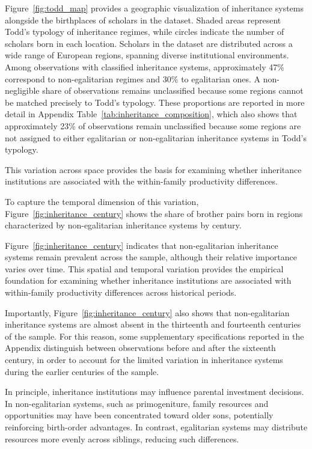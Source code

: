 Figure~\ref{fig:todd_map} provides a geographic visualization of inheritance systems alongside the birthplaces of scholars in the dataset. Shaded areas represent Todd’s typology of inheritance regimes, while circles indicate the number of scholars born in each location.
Scholars in the dataset are distributed across a wide range of European regions, spanning diverse institutional environments. Among observations with classified inheritance systems, approximately 47\% correspond to non-egalitarian regimes and 30\% to egalitarian ones. A non-negligible share of observations remains unclassified because some regions cannot be matched precisely to Todd's typology. These proportions are reported in more detail in Appendix Table~\ref{tab:inheritance_composition}, which also shows that approximately 23\% of observations remain unclassified because some regions are not assigned to either egalitarian or non-egalitarian inheritance systems in Todd’s typology.

This variation across space provides the basis for examining whether inheritance institutions are associated with the within-family productivity differences.

To capture the temporal dimension of this variation, Figure~\ref{fig:inheritance_century} shows the share of brother pairs born in regions characterized by non-egalitarian inheritance systems by century.

Figure~\ref{fig:inheritance_century} indicates that non-egalitarian inheritance systems remain prevalent across the sample, although their relative importance varies over time. This spatial and temporal variation provides the empirical foundation for examining whether inheritance institutions are associated with within-family productivity differences across historical periods.

Importantly, Figure~\ref{fig:inheritance_century} also shows that non-egalitarian inheritance systems are almost absent in the thirteenth and fourteenth centuries of the sample. For this reason, some supplementary specifications reported in the Appendix distinguish between observations before and after the sixteenth century, in order to account for the limited variation in inheritance systems during the earlier centuries of the sample.

In principle, inheritance institutions may influence parental investment decisions. In non-egalitarian systems, such as primogeniture, family resources and opportunities may have been concentrated toward older sons, potentially reinforcing birth-order advantages. In contrast, egalitarian systems may distribute resources more evenly across siblings, reducing such differences.

